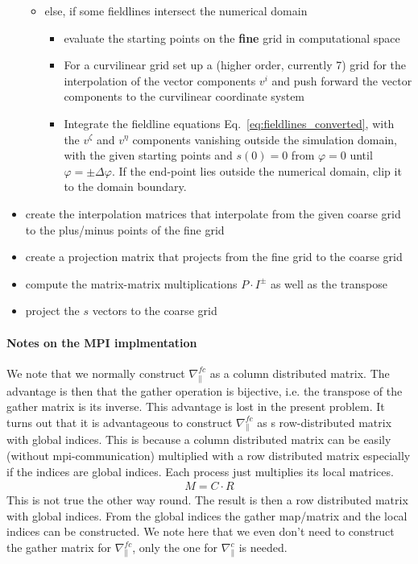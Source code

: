 \begin{itemize}
\begin{itemize}
    \item else, if some fieldlines intersect the numerical domain
    \begin{itemize}
      \item evaluate the starting points on the \textbf{fine} grid in computational space
      \item For a curvilinear grid set up a (higher order, currently 7) grid for the
        interpolation of the vector components $v^i$ and push forward the vector components
        to the curvilinear coordinate system
      \item Integrate the fieldline equations Eq.~\eqref{eq:fieldlines_converted}, with the $v^\zeta$ and $v^\eta$ components vanishing
      outside the simulation domain,
    with the given starting points and $s(0)=0$ from $\varphi=0$ until $\varphi = \pm\Delta \varphi$.
    If the end-point lies outside the numerical domain, clip it to the domain boundary.
    \end{itemize}
  \end{itemize}
  \item create the interpolation matrices that interpolate from the given coarse grid
    to the plus/minus points of the fine grid
  \item create a projection matrix that projects from the fine grid to the coarse grid
  \item compute the matrix-matrix multiplications $P\cdot I^\pm$ as well as the transpose
  \item project the $s$ vectors to the coarse grid
\end{itemize}

\paragraph{Notes on the MPI implmentation}
We note that we normally construct $\nabla_\parallel^{fc}$ as a column 
distributed
matrix. The advantage is then that the gather operation is bijective, i.e. the transpose of the gather matrix is its inverse. 
This advantage is lost in the present problem. 
It turns out that it is advantageous to construct $\nabla_\parallel^{fc}$
as s row-distributed matrix with global indices. 
This is because a column distributed matrix can be easily (without mpi-communication) multiplied
with a row distributed matrix especially if the indices are global indices. 
Each process just multiplies its local matrices.
\begin{align}
M = C\cdot R
\end{align}
This is not true the other way round. 
The result is then a row distributed matrix with global indices. 
From the global indices the gather map/matrix and the local
indices can be constructed.
We note here that we even don't need to construct the gather matrix
for $\nabla_\parallel^{fc}$, only the one for $\nabla_\parallel^c$ is
needed.

